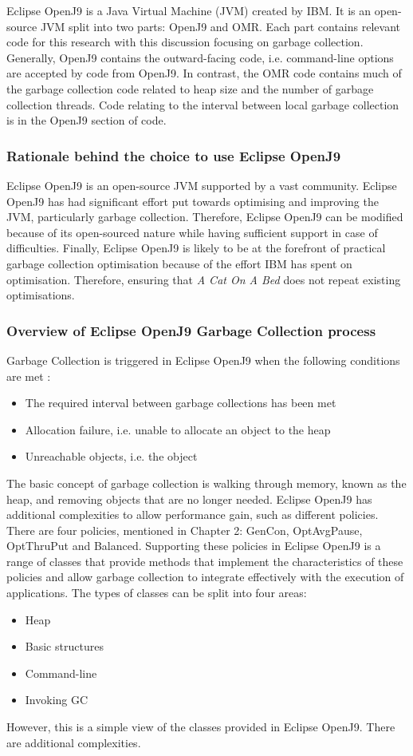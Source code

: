 Eclipse OpenJ9 is a Java Virtual Machine (JVM) created by IBM. It is an open-source JVM split into two parts: OpenJ9 and OMR. Each part contains relevant code for this research with this discussion focusing on garbage collection. Generally, OpenJ9 contains the outward-facing code, i.e. command-line options are accepted by code from OpenJ9. In contrast, the OMR code contains much of the garbage collection code related to heap size and the number of garbage collection threads. Code relating to the interval between local garbage collection is in the OpenJ9 section of code.
\subsubsection{Rationale behind the choice to use Eclipse OpenJ9}
Eclipse OpenJ9 is an open-source JVM supported by a vast community. Eclipse OpenJ9 has had significant effort put towards optimising and improving the JVM, particularly garbage collection. Therefore, Eclipse OpenJ9 can be modified because of its open-sourced nature while having sufficient support in case of difficulties. Finally, Eclipse OpenJ9 is likely to be at the forefront of practical garbage collection optimisation because of the effort IBM has spent on optimisation. Therefore, ensuring that \emph{A Cat On A Bed} does not repeat existing optimisations. 

\subsubsection{Overview of Eclipse OpenJ9 Garbage Collection process}
Garbage Collection is triggered in Eclipse OpenJ9 when the following conditions are met \cite{persson2006gc2}:
\begin{itemize}
    \item The required interval between garbage collections has been met
    \item Allocation failure, i.e. unable to allocate an object to the heap
    \item Unreachable objects, i.e. the object 
\end{itemize}
The basic concept of garbage collection is walking through memory, known as the heap, and removing objects that are no longer needed. Eclipse OpenJ9 has additional complexities to allow performance gain, such as different policies. There are four policies, mentioned in Chapter 2: GenCon, OptAvgPause, OptThruPut and Balanced. Supporting these policies in Eclipse OpenJ9 is a range of classes that provide methods that implement the characteristics of these policies and allow garbage collection to integrate effectively with the execution of applications. 
\newline\newline
The types of classes can be split into four areas: 
\begin{itemize}
    \item Heap
    \item Basic structures
    \item Command-line
    \item Invoking GC
\end{itemize}
However, this is a simple view of the classes provided in Eclipse OpenJ9. There are additional complexities. 
